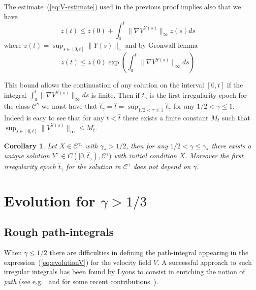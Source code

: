 \documentclass[a4paper,12pt,reqno]{amsart}
\newtheorem{corollary}{Corollary}
\newcommand{\CC}{\mathscr{C}}
\begin{document}
The estimate~(\ref{eq:V-estimate}) used in the previous proof implies
also that  we have
\begin{equation}
  \label{eq:V-estimate2}
 z(t) \le z(0) + \int_0^t \|\nabla V^{Y(s)}\|_\infty z(s)ds
\end{equation}
where  $z(t) = \sup_{s\in[0,t]}\|Y(s)\|_\gamma$
and by Gronwall lemma
$$
z(t) \le z(0) \exp\left(\int_0^t \|\nabla V^{Y(s)}\|_\infty ds \right)
$$

This bound allows the continuation of any solution on the interval
$[0,t]$ if the integral $\int_0^t \|\nabla V^{Y(s)}\|_\infty ds$ is
finite. Then if  $\hat t_\gamma$ is the first irregularity epoch
for the class $\CC^\gamma$ we must have that $\hat t_\gamma =
\hat t = \sup_{1/2 < \gamma \le 1} \hat t_\gamma$ for any $1/2 < \gamma \le 1$. Indeed is easy to see that
for any $t < \hat t$ there exists a finite constant
$M_t$ such that $\sup_{s \in [0,t]}\|V^{Y(s)}\|_\infty \le M_t$.

\begin{corollary}
Let $X \in \CC^{\gamma_*}$ with $\gamma_* > 1/2$, then
for any $1/2 < \gamma \le \gamma_*$ there exists a unique solution $Y^\gamma
\in C([0,\hat t_\gamma),\CC^\gamma)$
with initial condition $X$. Moreover the first irregularity epoch $\hat t_\gamma$ for the solution in
$\CC^\gamma$ does not depend on $\gamma$.
\end{corollary}






\section{Evolution for $\gamma > 1/3$}
\label{sec:rough}


\subsection{Rough path-integrals}
When $\gamma \le 1/2$ there are difficulties in defining the
path-integral appearing in the expression~(\ref{eq:evolutionV}) for
the velocity field $V$. A successful
approach to such irregular integrals has been found by Lyons to
consist in enriching the notion of \emph{path} (see
e.g.~\cite{LyonsBook,Lyons} and for some recent contributions~\cite{friz,Gubinelli,feyel}).
\end{document}
